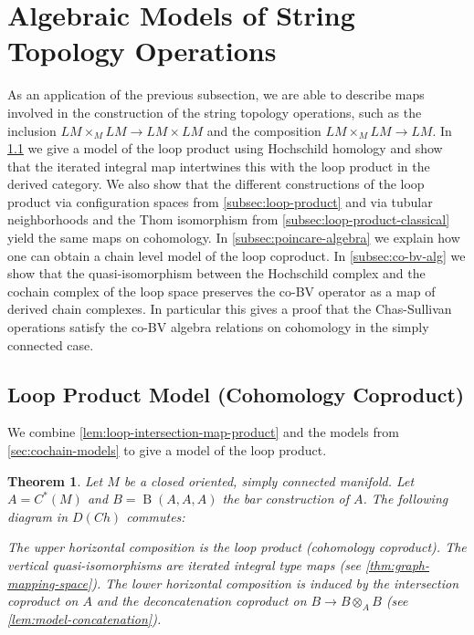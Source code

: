 \documentclass{scrartcl}
\theoremstyle{plain}
\newtheorem{theorem}{Theorem}[section]
\theoremstyle{definition}
\newcommand{\quiso}{\simeq}
\DeclareMathOperator{\id}{id}
\DeclareMathOperator{\BC}{B}
\begin{document}
\section{Algebraic Models of String Topology Operations}\label{sec:loop-models}
As an application of the previous subsection, we are able to describe maps involved in the construction of the string topology operations, such as the inclusion $LM\times_M LM\to LM\times LM$ and the composition $LM\times_M LM\to LM$. In \cref{subsec:loop-product-model} we give a model of the loop product using Hochschild homology and show that the iterated integral map intertwines this with the loop product in the derived category. We also show that the different constructions of the loop product via configuration spaces from \cref{subsec:loop-product} and via tubular neighborhoods and the Thom isomorphism from \cref{subsec:loop-product-classical} yield the same maps on cohomology. In \cref{subsec:poincare-algebra} we explain how one can obtain a chain level model of the loop coproduct. In \cref{subsec:co-bv-alg} we show that the quasi-isomorphism between the Hochschild complex and the cochain complex of the loop space preserves the co-BV operator as a map of derived chain complexes. In particular this gives a proof that the Chas-Sullivan operations satisfy the co-BV algebra relations  on cohomology in the simply connected case. 

\subsection{Loop Product Model (Cohomology Coproduct)}\label{subsec:loop-product-model}
We combine \cref{lem:loop-intersection-map-product} and the models from \cref{sec:cochain-models} to give a model of the loop product.

\begin{theorem}\label{thm:loop-product-derived}
    Let $M$ be a closed oriented, simply connected manifold. Let $A = C^*(M)$ and $B=\BC(A, A, A)$ the bar construction of $A$.
    The following diagram in $D(Ch)$ commutes:
    \begin{center}
    \end{center}
    The upper horizontal composition is the loop product (cohomology coproduct). The vertical quasi-isomorphisms are iterated integral type maps (see \cref{thm:graph-mapping-space}). The lower horizontal composition is induced by the intersection coproduct on $A$ and the deconcatenation coproduct on $B\to B\otimes_A B$ (see \cref{lem:model-concatenation}).
\end{theorem}
\end{document}
